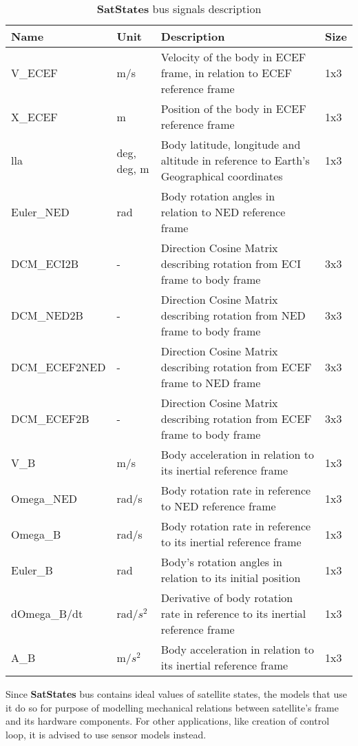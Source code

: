         \begin{table}[H]
            \begin{tabularx}{\textwidth}{llXl}
            \textbf{Name} & \textbf{Unit} & \textbf{Description} & \textbf{Size} \\ \hline
            V\_ECEF & m/s & Velocity of the body in ECEF frame, in relation to ECEF reference frame & 1x3 \\
            X\_ECEF & m & Position of the body in ECEF reference frame & 1x3 \\
            lla & deg, deg, m & Body latitude, longitude and altitude in reference to Earth's Geographical coordinates & 1x3 \\
            Euler\_NED & rad & Body rotation angles in relation to NED reference frame &  \\
            DCM\_ECI2B & - & Direction Cosine Matrix describing rotation from ECI frame to body frame & 3x3 \\
            DCM\_NED2B & - &  Direction Cosine Matrix describing rotation from NED frame to body frame & 3x3  \\
            DCM\_ECEF2NED & - & Direction Cosine Matrix describing rotation from ECEF frame to NED frame & 3x3  \\
            DCM\_ECEF2B & - &  Direction Cosine Matrix describing rotation from ECEF frame to body frame & 3x3  \\
            V\_B & m/s & Body acceleration in relation to its inertial reference frame &  1x3 \\
            Omega\_NED & rad/s & Body rotation rate in reference to NED reference frame & 1x3  \\
            Omega\_B & rad/s & Body rotation rate in reference to its inertial reference frame  & 1x3 \\
            Euler\_B & rad & Body's rotation angles in relation to its initial position  & 1x3 \\
            dOmega\_B/dt & rad/$s^2$ & Derivative of body rotation rate in reference to its inertial reference frame & 1x3 \\
            A\_B & m/$s^2$ & Body acceleration in relation to its inertial reference frame & 1x3 \\ \hline
            \end{tabularx}
            \caption{\textbf{SatStates} bus signals description}
        \end{table}

        Since \textbf{SatStates} bus contains ideal values of satellite states, the models that use it do so for purpose of modelling mechanical relations between satellite's frame and its hardware components. For other applications, like creation of control loop, it is advised to use sensor models instead.

